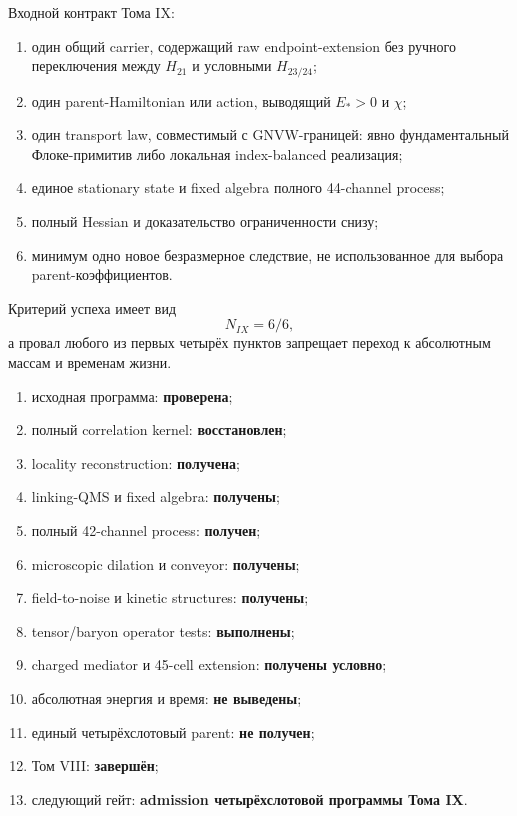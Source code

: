 Входной контракт Тома IX:
\begin{enumerate}
 \item один общий carrier, содержащий raw endpoint-extension без ручного
 переключения между $H_{21}$ и условными $H_{23/24}$;
 \item один parent-Hamiltonian или action, выводящий $E_*>0$ и $\chi$;
 \item один transport law, совместимый с GNVW-границей: явно фундаментальный
 Флоке-примитив либо локальная index-balanced реализация;
 \item единое stationary state и fixed algebra полного 44-channel process;
 \item полный Hessian и доказательство ограниченности снизу;
 \item минимум одно новое безразмерное следствие, не использованное для
 выбора parent-коэффициентов.
\end{enumerate}

Критерий успеха имеет вид
\begin{equation}
 N_{IX}=6/6,
 \label{eq:v8-final-tome9-success}
\end{equation}
а провал любого из первых четырёх пунктов запрещает переход к абсолютным
массам и временам жизни.

\begin{protocol}\begin{enumerate}
\item исходная программа: \textbf{проверена};
\item полный correlation kernel: \textbf{восстановлен};
\item locality reconstruction: \textbf{получена};
\item linking-QMS и fixed algebra: \textbf{получены};
\item полный 42-channel process: \textbf{получен};
\item microscopic dilation и conveyor: \textbf{получены};
\item field-to-noise и kinetic structures: \textbf{получены};
\item tensor/baryon operator tests: \textbf{выполнены};
\item charged mediator и 45-cell extension: \textbf{получены условно};
\item абсолютная энергия и время: \textbf{не выведены};
\item единый четырёхслотовый parent: \textbf{не получен};
\item Том VIII: \textbf{завершён};
\item следующий гейт: \textbf{admission четырёхслотовой программы Тома IX}.
\end{enumerate}\end{protocol}
